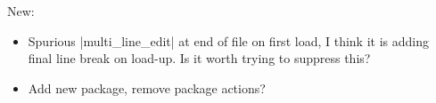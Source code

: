 \documentclass{book}
\begin{document}
New:
\begin{itemize}
\item Spurious |multi_line_edit| at end of file on first load, I think it is adding final
  line break on load-up.  Is it worth trying to suppress this?
\item Add new package, remove package actions?
\end{itemize}
\end{document}
